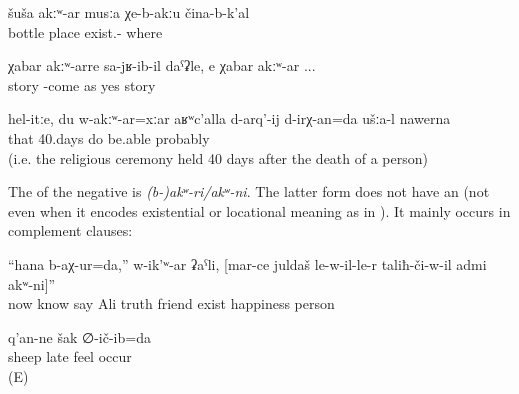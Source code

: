 \begin{exe}
	\ex	\label{ex:There is no place without bottles}
	\gll	šuša	akːʷ-ar	musːa	χe-b-akːu	čina-b-k'al\\
		bottle		place	exist.-	where\\
	\glt	{}

	\ex	\label{ex:as if his arrival was unexpected (lit. without news), yes unexpected}
	\gll	χabar	akːʷ-arre	sa-jʁ-ib-il	daˁʡle,		e	χabar	akːʷ-ar ...\\
		story		-come	as	yes	story	\\
	\glt	{}

	\ex	\label{ex:Well, you like this, even me not being there, should be able to do the 40 days, probably}
	\gll	hel-itːe,	du	w-akːʷ-ar=xːar	aʁʷc'alla	d-arq'-ij	d-irχ-an=da	ušːa-l		nawerna\\
		that			40.days	do	be.able			probably\\
	\glt	{} (i.e. the religious ceremony held 40 days after the death of a person)
\end{exe}

The  of the negative  is \textit{{(b-)akʷ-ri\slash akʷ-ni}}. The latter form does not have an  (not even when it encodes existential or locational meaning as in ). It mainly occurs in complement clauses:

\begin{exe}
	\ex	\label{ex:Now I know, says Ali, that there is no happy man than the one who has a true friend}
	\gll	``hana	b-aχ-ur=da,''	w-ik'ʷ-ar	ʡaˁli,	[mar-ce	juldaš	le-w-il-le-r	taliħ-či-w-il	admi	akʷ-ni]''\\
		now	know	say	Ali	truth	friend	exist	happiness	person	\\
	\glt	{}

	\ex	\label{ex:I guessed late that my sheep were not there}
		q'an-ne	šak	∅-ič-ib=da\\
			sheep		late	feel	occur\\
	\glt	{} (E)
\end{exe}


